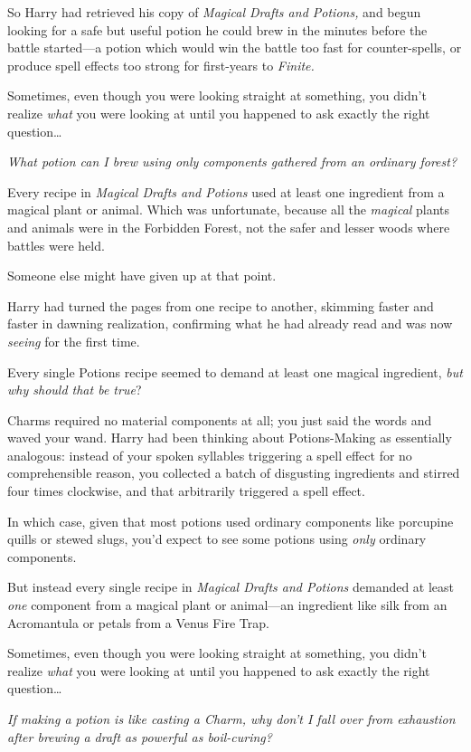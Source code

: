 So Harry had retrieved his copy of \emph{Magical Drafts and Potions,} and begun looking for a safe but useful potion he could brew in the minutes before the battle started—a potion which would win the battle too fast for counter-spells, or produce spell effects too strong for first-years to \emph{Finite.}

Sometimes, even though you were looking straight at something, you didn't realize \emph{what} you were looking at until you happened to ask exactly the right question{\ldots}

\emph{What potion can I brew using only components gathered from an ordinary forest?}

Every recipe in \emph{Magical Drafts and Potions} used at least one ingredient from a magical plant or animal. Which was unfortunate, because all the \emph{magical} plants and animals were in the Forbidden Forest, not the safer and lesser woods where battles were held.

Someone else might have given up at that point.

Harry had turned the pages from one recipe to another, skimming faster and faster in dawning realization, confirming what he had already read and was now \emph{seeing} for the first time.

Every single Potions recipe seemed to demand at least one magical ingredient, \emph{but why should that be true}?

Charms required no material components at all; you just said the words and waved your wand. Harry had been thinking about Potions-Making as essentially analogous: instead of your spoken syllables triggering a spell effect for no comprehensible reason, you collected a batch of disgusting ingredients and stirred four times clockwise, and that arbitrarily triggered a spell effect.

In which case, given that most potions used ordinary components like porcupine quills or stewed slugs, you'd expect to see some potions using \emph{only} ordinary components.

But instead every single recipe in \emph{Magical Drafts and Potions} demanded at least \emph{one} component from a magical plant or animal—an ingredient like silk from an Acromantula or petals from a Venus Fire Trap.

Sometimes, even though you were looking straight at something, you didn't realize \emph{what} you were looking at until you happened to ask exactly the right question{\ldots}

\emph{If making a potion is like casting a Charm, why don't I fall over from exhaustion after brewing a draft as powerful as boil-curing?}

